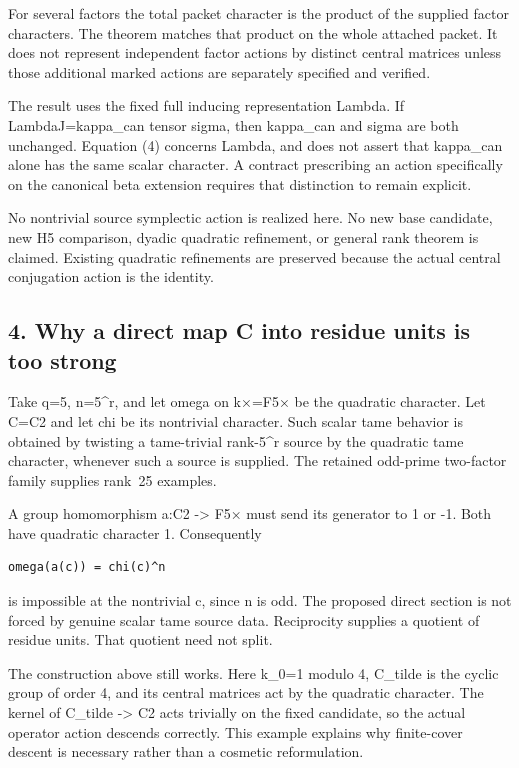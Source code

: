 For several factors the total packet character is the product of the
supplied factor characters. The theorem matches that product on the
whole attached packet. It does not represent independent factor actions
by distinct central matrices unless those additional marked actions are
separately specified and verified.

The result uses the fixed full inducing representation Lambda. If
Lambda\textbar J=kappa\_can tensor sigma, then kappa\_can and sigma are
both unchanged. Equation (4) concerns Lambda, and does not assert that
kappa\_can alone has the same scalar character. A contract prescribing
an action specifically on the canonical beta extension requires that
distinction to remain explicit.

No nontrivial source symplectic action is realized here. No new base
candidate, new H5 comparison, dyadic quadratic refinement, or general
rank theorem is claimed. Existing quadratic refinements are preserved
because the actual central conjugation action is the identity.

\hypertarget{odd_scalar-why-a-direct-map-c-into-residue-units-is-too-strong}{%
\subsection{4. Why a direct map C into residue units is too
strong}\label{odd_scalar-why-a-direct-map-c-into-residue-units-is-too-strong}}

Take q=5, n=5\^{}r, and let omega on k×=F5× be the quadratic character.
Let C=C2 and let chi be its nontrivial character. Such scalar tame
behavior is obtained by twisting a tame-trivial rank-5\^{}r source by
the quadratic tame character, whenever such a source is supplied. The retained odd-prime two-factor family supplies rank~25 examples.

A group homomorphism a:C2 -\textgreater{} F5× must send its generator
to 1 or -1. Both have quadratic character 1. Consequently

\begin{Verbatim}[fontsize=\small,breaklines=true,breakanywhere=true]
omega(a(c)) = chi(c)^n
\end{Verbatim}

is impossible at the nontrivial c, since n is odd. The proposed direct
section is not forced by genuine scalar tame source data. Reciprocity supplies a quotient of residue units. That quotient need not split.

The construction above still works. Here k\_0=1 modulo 4, C\_tilde is the
cyclic group of order 4, and its central matrices act by the quadratic
character. The kernel of C\_tilde -\textgreater{} C2 acts trivially on
the fixed candidate, so the actual operator action descends correctly.
This example explains why finite-cover descent is necessary rather than
a cosmetic reformulation.

